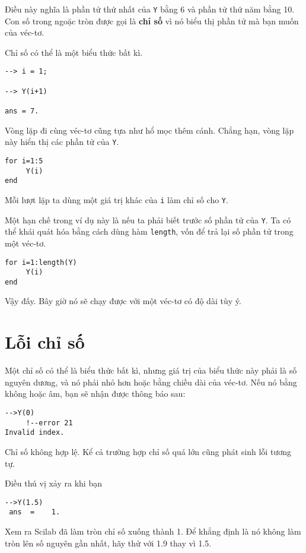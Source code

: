 \documentclass[12pt]{book}
\begin{document}
Điều này nghĩa là phần tử thứ nhất của {\tt Y} bằng 6 và
phần tử thứ năm bằng 10. Con số trong ngoặc tròn được gọi
là {\bf chỉ số} vì nó biểu thị phần tử mà bạn muốn của
véc-tơ.

Chỉ số có thể là một biểu thức bất kì.

\begin{verbatim}
--> i = 1;

--> Y(i+1)

ans = 7.
\end{verbatim}

Vòng lặp đi cùng véc-tơ cũng tựa như hổ mọc thêm cánh.
Chẳng hạn, vòng lặp này hiển thị các phần tử của {\tt Y}.

\begin{verbatim}
for i=1:5
     Y(i)
end
\end{verbatim}

Mỗi lượt lặp ta dùng một giá trị khác của {\tt i} làm chỉ số
cho {\tt Y}.

Một hạn chế trong ví dụ này là nếu ta phải biết trước số
phần tử của {\tt Y}. Ta có thể khái quát hóa bằng cách dùng
hàm {\tt length}, vốn để trả lại số phần tử trong một véc-tơ.

\begin{verbatim}
for i=1:length(Y)
     Y(i)
end
\end{verbatim}

Vậy đấy. Bây giờ nó sẽ chạy được với một véc-tơ có độ dài tùy ý.


\section{Lỗi chỉ số}

Một chỉ số có thể là biểu thức bất kì, nhưng giá trị của 
biểu thức này phải là số nguyên dương, và nó phải nhỏ hơn
hoặc bằng chiều dài của véc-tơ. Nếu nó bằng không hoặc âm,
bạn sẽ nhận được thông báo sau:

\begin{verbatim}
-->Y(0)
     !--error 21 
Invalid index.
\end{verbatim}

Chỉ số không hợp lệ. Kể cả trường hợp chỉ số quá lớn 
cũng phát sinh lỗi tương tự.

Điều thú vị xảy ra khi bạn 
\begin{verbatim}
-->Y(1.5)
 ans  =    1.  
\end{verbatim}

Xem ra Scilab đã làm tròn chỉ số xuống thành 1. Để khẳng định là
nó không làm tròn lên số nguyên gần nhất, hãy thử với 1.9 thay vì 1.5.
\end{document}
